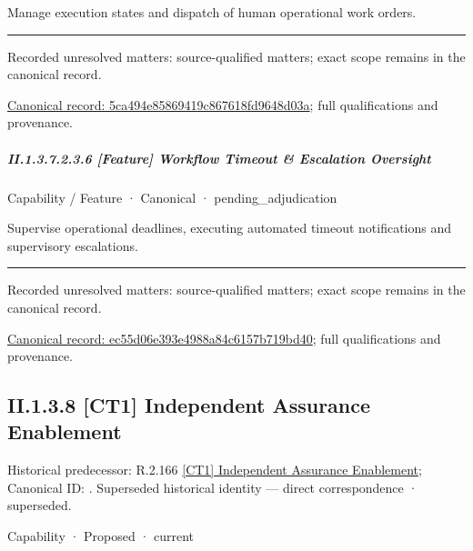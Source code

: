 Manage execution states and dispatch of human operational work orders.



\medskip\hrule\medskip

{\small Recorded unresolved matters: source-qualified matters; exact scope remains in the canonical record.}\par
{\footnotesize \href{../../../../continuum/strategy/capability/feature/5ca494e85869419c867618fd9648d03a.md}{Canonical record: 5ca494e85869419c867618fd9648d03a}; full qualifications and provenance.}\par
\subparagraph*{II.1.3.7.2.3.6 [Feature] Workflow Timeout \& Escalation Oversight}
\label{navigation:II.1.3.7.2.3.6}

\label{element:ec55d06e393e4988a84c6157b719bd40}
{\small Capability / Feature · Canonical · pending\_adjudication}\par

Supervise operational deadlines, executing automated timeout notifications and supervisory escalations.



\medskip\hrule\medskip

{\small Recorded unresolved matters: source-qualified matters; exact scope remains in the canonical record.}\par
{\footnotesize \href{../../../../continuum/strategy/capability/feature/ec55d06e393e4988a84c6157b719bd40.md}{Canonical record: ec55d06e393e4988a84c6157b719bd40}; full qualifications and provenance.}\par
\subsection*{II.1.3.8 [CT1] Independent Assurance Enablement}
\label{navigation:II.1.3.8}

{\small Historical predecessor: R.2.166 \hyperref[element:88bf57b7a92c4c1da1b5f0a67d3ebd82]{[CT1] Independent Assurance Enablement}; Canonical ID: \texttt{}. Superseded historical identity — direct correspondence · superseded.}\par
\label{element:616682b612d244429e656b040e002d56}
{\small Capability · Proposed · current}\par

